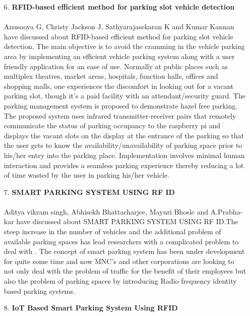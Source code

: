 \documentclass[12pt,a4paper]{report}
\begin{document}
\begin{itemize}
	
	\item[ 6. ] \textbf{RFID-based efficient method for parking slot vehicle detection}\\\\
Anusooya G, Christy Jackson J, Sathyarajasekaran K and Kumar Kannan have discussed about RFID-based efficient method for parking slot vehicle detection.
	The  main 
	objective  is  to  avoid  the  cramming  in  the  vehicle 
	parking area by implementing an efficient vehicle parking system 
	along with a user friendly
	application for an ease of use. 
	Normally at public places such as multiplex theatres, market 
	areas, hospitals, function halls,  offices  and  shopping  malls, 
	one  experiences the discomfort  in  looking  out  for  a  vacant 
	parking  slot,  though  it’s  a  paid  facility  with  an  attendant/security  guard.  The  parking  management  system  is  proposed 
	to  demonstrate  hazel  free  parking. The  proposed  system  uses 
	infrared  transmitter-receiver  pairs  that  remotely  communicate 
	the  status  of  parking  occupancy  to  the  raspberry  pi  and 
	displays  the  vacant  slots  on  the  display  at  the  entrance  of  the 
	parking   so   that   the   user   gets   to   know   the   availability/unavailability of parking space prior to his/her entry into the 
	parking   place.   Implementation   involves   minimal   human 
	interaction   and   provides   a   seamless   parking   experience 
	thereby  reducing  a  lot  of  time  wasted  by  the  user  in  parking 
	his/her vehicle.
	\item[ 7. ] \textbf{SMART PARKING SYSTEM USING RF ID}\\\\
		Aditya vikram singh, Abhisekh Bhattacharjee, Mayuri Bhosle and 
	A.Prabha-kar have discussed about SMART PARKING SYSTEM USING RF ID.The steep increase in the number of vehicles and the additional   problem   of      available   parking   spaces   has   lead 
	researchers  with  a  complicated  problem  to  deal  with  .  The 
	concept of smart parking system has been under development for 
	quite  some  time  and  now  MNC's  and  other  corporations  are 
	looking to not only deal with the problem of traffic for the benefit 
	of  their  employees  but  also  the  problem  of  parking  spaces  by 
	introducing Radio frequency identity based parking systems.
	
	\item[ 8. ] \textbf{IoT Based Smart Parking System Using RFID}\\


\end{itemize}
\end{document}
